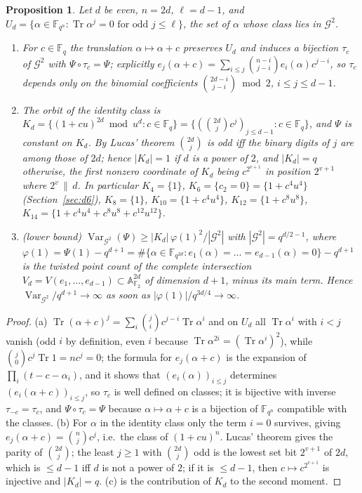 \documentclass[11pt,a4paper]{amsart}
\newtheorem{proposition}[theorem]{Proposition}
\theoremstyle{definition}
\newcommand{\F}{\mathbb{F}}
\newcommand{\A}{\mathbb{A}}
\newcommand{\G}{\mathcal{G}}
\newcommand{\Tr}{\operatorname{Tr}}
\newcommand{\Var}{\operatorname{Var}}
\begin{document}
\begin{proposition}\label{prop:Kd}
Let $d$ be even, $n=2d$, $\ell=d-1$, and $U_d=\{\alpha\in\F_{q^n}:\Tr\alpha^j=0\text{ for odd }j\le\ell\}$, the set of $\alpha$ whose class lies in $\G^2$.
\begin{enumerate}[label=\textup{(\alph*)},leftmargin=2em]
\item For $c\in\F_q$ the translation $\alpha\mapsto\alpha+c$ preserves $U_d$ and induces a bijection $\tau_c$ of $\G^2$ with $\Psi\circ\tau_c=\Psi$; explicitly $e_j(\alpha+c)=\sum_{i\le j}\binom{n-i}{j-i}e_i(\alpha)c^{j-i}$, so $\tau_c$ depends only on the binomial coefficients $\binom{2d-i}{j-i}\bmod2$, $i\le j\le d-1$.
\item The orbit of the identity class is $K_d=\{(1+cu)^{2d}\bmod u^d:c\in\F_q\}=\{(\binom{2d}{j}c^j)_{j\le d-1}:c\in\F_q\}$, and $\Psi$ is constant on $K_d$. By Lucas' theorem $\binom{2d}j$ is odd iff the binary digits of $j$ are among those of $2d$; hence $|K_d|=1$ if $d$ is a power of $2$, and $|K_d|=q$ otherwise, the first nonzero coordinate of $K_d$ being $c^{2^{v+1}}$ in position $2^{v+1}$ where $2^v\,\|\,d$. In particular $K_4=\{1\}$, $K_6=\{c_2=0\}=\{1+c^4u^4\}$ (Section~\ref{sec:d6}), $K_8=\{1\}$, $K_{10}=\{1+c^4u^4\}$, $K_{12}=\{1+c^8u^8\}$, $K_{14}=\{1+c^4u^4+c^8u^8+c^{12}u^{12}\}$.
\item (lower bound) $\Var_{\G^2}(\Psi)\ge|K_d|\,\varphi(1)^2/|\G^2|$ with $|\G^2|=q^{d/2-1}$, where $\varphi(1)=\Psi(1)-q^{d+1}=\#\{\alpha\in\F_{q^{2d}}:e_1(\alpha)=\dots=e_{d-1}(\alpha)=0\}-q^{d+1}$ is the twisted point count of the complete intersection $V_d=V(e_1,\dots,e_{d-1})\subset\A^{2d}_{\F_2}$ of dimension $d+1$, minus its main term. Hence $\Var_{\G^2}/q^{d+1}\to\infty$ as soon as $|\varphi(1)|/q^{3d/4}\to\infty$.
\end{enumerate}
\end{proposition}
\begin{proof}
(a) $\Tr(\alpha+c)^j=\sum_i\binom ji c^{j-i}\Tr\alpha^i$ and on $U_d$ all $\Tr\alpha^i$ with $i<j$ vanish (odd $i$ by definition, even $i$ because $\Tr\alpha^{2i}=(\Tr\alpha^i)^2$), while $\binom j0c^j\Tr1=nc^j=0$; the formula for $e_j(\alpha+c)$ is the expansion of $\prod_i(t-c-\alpha_i)$, and it shows that $(e_i(\alpha))_{i\le j}$ determines $(e_i(\alpha+c))_{i\le j}$, so $\tau_c$ is well defined on classes; it is bijective with inverse $\tau_{-c}=\tau_c$, and $\Psi\circ\tau_c=\Psi$ because $\alpha\mapsto\alpha+c$ is a bijection of $\F_{q^n}$ compatible with the classes. (b) For $\alpha$ in the identity class only the term $i=0$ survives, giving $e_j(\alpha+c)=\binom nj c^j$, i.e.\ the class of $(1+cu)^n$. Lucas' theorem gives the parity of $\binom{2d}{j}$; the least $j\ge1$ with $\binom{2d}j$ odd is the lowest set bit $2^{v+1}$ of $2d$, which is $\le d-1$ iff $d$ is not a power of $2$; if it is $\le d-1$, then $c\mapsto c^{2^{v+1}}$ is injective and $|K_d|=q$. (c) is the contribution of $K_d$ to the second moment.
\end{proof}
\end{document}

